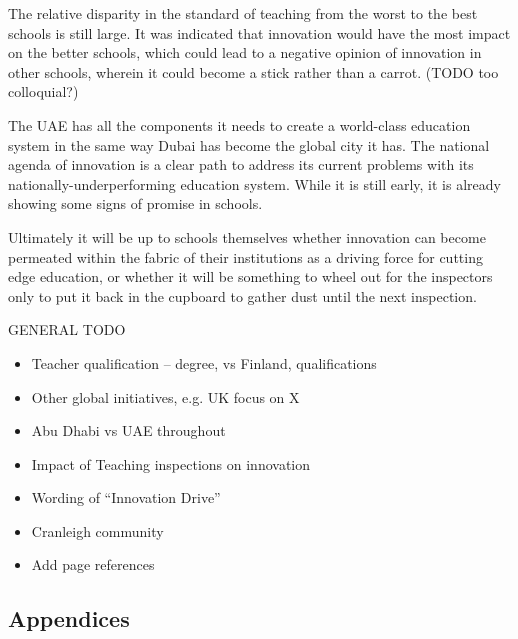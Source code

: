 The relative disparity in the standard of teaching from the worst to the best schools is still large. It was indicated that innovation would have the most impact on the better schools, which could lead to a negative opinion of innovation in other schools, wherein it could become a stick rather than a carrot. (TODO too colloquial?)

The UAE has all the components it needs to create a world-class education system in the same way Dubai has become the global city it has. The national agenda of innovation is a clear path to address its current problems with its nationally-underperforming education system. While it is still early, it is already showing some signs of promise in schools. 

Ultimately it will be up to schools themselves whether innovation can become permeated within the fabric of their institutions as a driving force for cutting edge education, or whether it will be something to wheel out for the inspectors only to put it back in the cupboard to gather dust until the next inspection.

GENERAL TODO
\begin{itemize}
\item Teacher qualification – degree, vs Finland, qualifications
\item Other global initiatives, e.g. UK focus on X
\item Abu Dhabi vs UAE throughout
\item Impact of Teaching inspections on innovation
\item Wording of “Innovation Drive”
\item Cranleigh community
\item Add page references

\end{itemize}

\subsection{Appendices}

